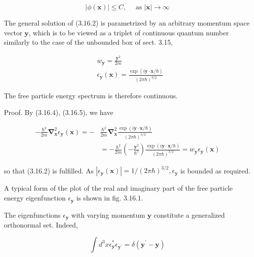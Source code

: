 \documentclass{article}
\begin{document}
\begin{equation*}
|\phi(\boldsymbol{x})| \leq C, \quad \text { as }|\boldsymbol{x}| \rightarrow \infty \tag{3.16.3}
\end{equation*}
 

The general solution of (3.16.2) is parametrized by an arbitrary momentum space vector $\boldsymbol{y}$, which is to be viewed as a triplet of continuous quantum number similarly to the case of the unbounded box of sect. 3.15,
 
\begin{align*}
& w_{\boldsymbol{y}}=\frac{\boldsymbol{y}^{2}}{2 m}  \tag{3.16.4}\\
& \epsilon_{\boldsymbol{y}}(\boldsymbol{x})=\frac{\exp (i \boldsymbol{y} \cdot \boldsymbol{x} / \hbar)}{(2 \pi \hbar)^{3 / 2}} \tag{3.16.5}
\end{align*}
 

The free particle energy spectrum is therefore continuous.

Proof. By (3.16.4), (3.16.5), we have
 
\begin{align*}
-\frac{\hbar^{2}}{2 m} \boldsymbol{\nabla}_{\boldsymbol{x}}^{2} \epsilon_{\boldsymbol{y}}(\boldsymbol{x})=- & \frac{\hbar^{2}}{2 m} \boldsymbol{\nabla}_{\boldsymbol{x}}^{2} \frac{\exp (i \boldsymbol{y} \cdot \boldsymbol{x} / \hbar)}{(2 \pi \hbar)^{3 / 2}}  \tag{3.16.6}\\
& =-\frac{\hbar^{2}}{2 m}\left(-\frac{\boldsymbol{y}^{2}}{\hbar^{2}}\right) \frac{\exp (i \boldsymbol{y} \cdot \boldsymbol{x} / \hbar)}{(2 \pi \hbar)^{3 / 2}}=w_{\boldsymbol{y}} \epsilon_{\boldsymbol{y}}(\boldsymbol{x})
\end{align*}
 
so that (3.16.2) is fulfilled. As $\left|\epsilon_{\boldsymbol{y}}(\boldsymbol{x})\right|=1 /(2 \pi \hbar)^{3 / 2}, \epsilon_{\boldsymbol{y}}$ is bounded as required.

A typical form of the plot of the real and imaginary part of the free particle energy eigenfunction $\epsilon_{\boldsymbol{y}}$ is shown in fig. 3.16.1.

The eigenfunctions $\epsilon_{\boldsymbol{y}}$ with varying momentum $\boldsymbol{y}$ constitute a generalized orthonormal set. Indeed,
 
\begin{equation*}
\int d^{3} x \epsilon_{\boldsymbol{y}}^{*} \epsilon_{\boldsymbol{y}^{\prime}}=\delta\left(\boldsymbol{y}^{\prime}-\boldsymbol{y}\right) \tag{3.16.7}
\end{equation*}
 
\end{document}
